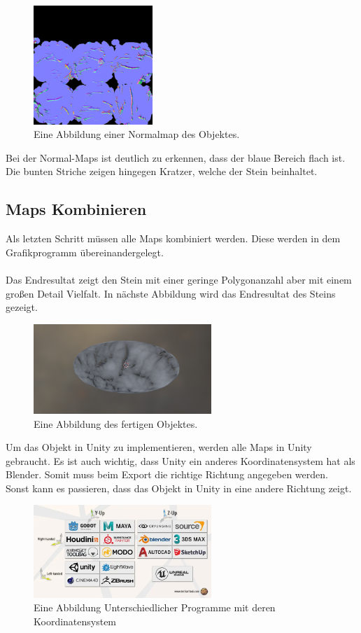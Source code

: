 \begin{figure}[H]
    \centering
    \includegraphics[width=0.4\textwidth]{chapters/11/Images/SteinNormal.png}
    \caption{Eine Abbildung einer Normalmap des Objektes.}
    \label{htl01}
\end{figure}

\noindent Bei der Normal-Maps ist deutlich zu erkennen, dass der blaue Bereich flach ist. Die bunten Striche zeigen hingegen Kratzer, welche der Stein beinhaltet.

\subsection{Maps Kombinieren}

Als letzten Schritt müssen alle Maps kombiniert werden. Diese werden in dem Grafikprogramm übereinandergelegt.\\\\
Das Endresultat zeigt den Stein mit einer geringe Polygonanzahl aber mit einem großen Detail Vielfalt. In nächste Abbildung wird das Endresultat des Steins gezeigt.

\begin{figure}[H]
    \centering
    \includegraphics[width=0.6\textwidth]{chapters/11/Images/SteinCombi.png}
    \caption{Eine Abbildung des fertigen Objektes.}
    \label{htl01}
\end{figure}

Um das Objekt in Unity zu implementieren, werden alle Maps in Unity gebraucht. Es ist auch wichtig, dass Unity ein anderes Koordinatensystem hat als Blender. Somit muss beim Export die richtige Richtung angegeben werden.  Sonst kann es passieren, dass das Objekt in Unity in eine andere Richtung zeigt.

\begin{figure}[H]
    \centering
    \includegraphics[width=0.6\textwidth]{chapters/11/Images/Koordinaten.png}
    \caption{Eine Abbildung Unterschiedlicher Programme mit deren Koordinatensystem}
    \label{htl01}
\end{figure}

\pagebreak